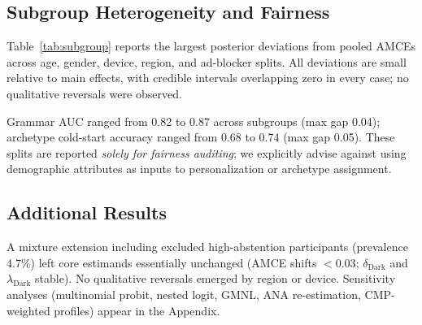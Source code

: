 \documentclass{eusset}
\begin{document}
\subsection{Subgroup Heterogeneity and Fairness}
\label{subsec:subgroup}
Table~\ref{tab:subgroup} reports the largest posterior deviations from pooled AMCEs across age, gender, device, region, and ad-blocker splits. All deviations are small relative to main effects, with credible intervals overlapping zero in every case; no qualitative reversals were observed.


\begin{table}[ht]
  \centering
  \caption{Largest subgroup deviations from pooled AMCEs (posterior mean [95\% HDI]). All intervals overlap zero; no qualitative reversals were observed.}
  \label{tab:subgroup}
\end{table}


Grammar AUC ranged from 0.82 to 0.87 across subgroups (max gap 0.04); archetype cold-start accuracy ranged from 0.68 to 0.74 (max gap 0.05). These splits are reported \emph{solely for fairness auditing}; we explicitly advise against using demographic attributes as inputs to personalization or archetype assignment.

\subsection{Additional Results}
A mixture extension including excluded high-abstention participants (prevalence 4.7\%) left core estimands essentially unchanged (AMCE shifts $<\!0.03$; $\delta_{\text{Dark}}$ and $\lambda_{\text{Dark}}$ stable). No qualitative reversals emerged by region or device. Sensitivity analyses (multinomial probit, nested logit, GMNL, ANA re-estimation, CMP-weighted profiles) appear in the Appendix.
\end{document}
